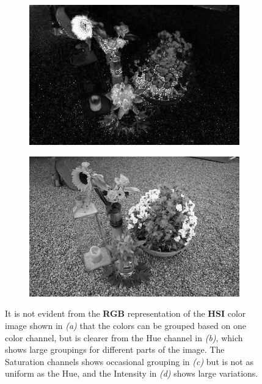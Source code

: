 \begin{figure}[H]
\begin{subfigure}[b]{0.49\textwidth}
		\caption{}
		\label{fig:imgH}
    \end{subfigure}
    \begin{subfigure}[b]{0.49\textwidth}
        \centering
        \includegraphics[width=\textwidth]{./figure/appendix/color_rep/images/imgS.jpg}
		\caption{}
		\label{fig:imgS}
    \end{subfigure}
    \begin{subfigure}[b]{0.49\textwidth}
        \centering
        \includegraphics[width=\textwidth]{./figure/appendix/color_rep/images/imgI.jpg}
		\caption{}
		\label{fig:imgI}
    \end{subfigure}
    \caption{It is not evident from the \textbf{RGB} representation of the \textbf{HSI} color image shown in \textit{(a)} that the colors can be grouped based on one color channel, but is clearer from the Hue channel in \textit{(b)}, which shows large groupings for different parts of the image. The Saturation channels shows occasional grouping in \textit{(c)} but is not as uniform as the Hue, and the Intensity in \textit{(d)} shows large variations.}
    \label{fig:hsiChannels}
\end{figure}


